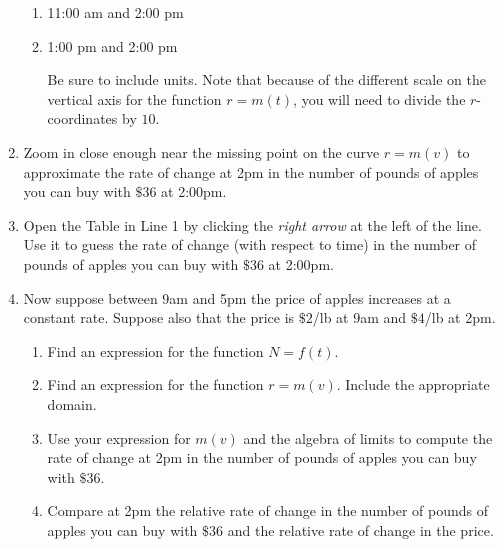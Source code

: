 \documentclass{ximera}
\begin{document}
\begin{question}
\begin{enumerate}
\begin{enumerate}
\item 11:00 am and 2:00 pm

\item 1:00 pm and 2:00 pm

Be sure to include units. Note that because of the different  scale on the vertical axis for the function $r=m(t)$, you will need to divide the $r$-coordinates by $10$.

\end{enumerate}

\item Zoom in close enough near the missing point on the curve $r=m(v)$ to approximate the rate of change at 2pm in the number of pounds of apples you can buy with $\$36$  at 2:00pm.

\item Open the Table in Line 1 by clicking the \emph{right arrow} at the left of the line. Use it to guess the rate of change (with respect to time) in the number of pounds of apples you can buy with $\$36$  at 2:00pm.

\item Now suppose between 9am and 5pm the price of apples increases at a constant rate. Suppose also that the price is $\$2$/lb at 9am and $\$4$/lb at 2pm. 

\begin{enumerate}
\item Find an expression for the function $N=f(t)$.

\item Find an expression for the function $r=m(v)$. Include the appropriate domain.

\item Use your expression for $m(v)$ and the algebra of limits to compute the rate of change at 2pm in the number of pounds of apples you can buy with $\$36$.

\item Compare at 2pm the relative rate of change in the number of pounds of apples you can buy with $\$36$ and the relative rate of change in the price.
\end{enumerate}

\end{enumerate}
\end{question}
\end{document}
